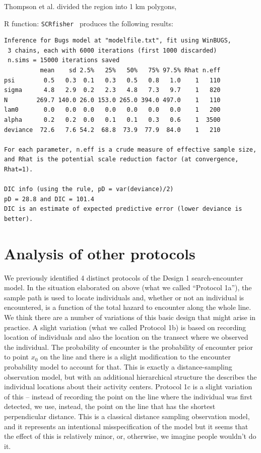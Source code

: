 Thompson et al. divided the region into 1 km polygons,

R function: \mbox{\tt SCRfisher  } produces the following results:

{\small
\begin{verbatim}
Inference for Bugs model at "modelfile.txt", fit using WinBUGS,
 3 chains, each with 6000 iterations (first 1000 discarded)
 n.sims = 15000 iterations saved
          mean    sd 2.5%   25%   50%   75% 97.5% Rhat n.eff
psi        0.5   0.3  0.1   0.3   0.5   0.8   1.0    1   110
sigma      4.8   2.9  0.2   2.3   4.8   7.3   9.7    1   820
N        269.7 140.0 26.0 153.0 265.0 394.0 497.0    1   110
lam0       0.0   0.0  0.0   0.0   0.0   0.0   0.0    1   200
alpha      0.2   0.2  0.0   0.1   0.1   0.3   0.6    1  3500
deviance  72.6   7.6 54.2  68.8  73.9  77.9  84.0    1   210

For each parameter, n.eff is a crude measure of effective sample size,
and Rhat is the potential scale reduction factor (at convergence, Rhat=1).

DIC info (using the rule, pD = var(deviance)/2)
pD = 28.8 and DIC = 101.4
DIC is an estimate of expected predictive error (lower deviance is better).
\end{verbatim}
}


\section{Analysis of other protocols}

We previously identified 4 distinct protocols of the Design 1
search-encounter model.
In the situation elaborated on above (what we called ``Protocol 1a''), the sample path is used to
locate individuals and, whether or not an individual is encountered,
is a function of the total hazard to encounter along the whole line.
We think there are a number of variations of this basic design that
might arise in practice.
A slight variation (what we called Protocol 1b) is based on 
recording location of individuals and also the location on the transect
where we observed the individual.  The probability of encounter is the
probability of encounter prior to point $x_{0}$ on the line
\citep{skaug_schweder:1999} and there is a slight modification to the
encounter probability model to account for that. This is exactly a
distance-sampling observation model, but with an additional
hierarchical structure the describes the individual locations about
their activity centers.  Protocol 1c is a slight variation of this --
instead of recording the point on the line where the individual was
first detected, we use, instead, the point on the line that has the
shortest perpendicular distance. This is a classical distance sampling
observation model, and it represents an intentional misspecification
of the model but it seems that the effect of this is relatively minor,
or, otherwise, we imagine people wouldn't do it.

